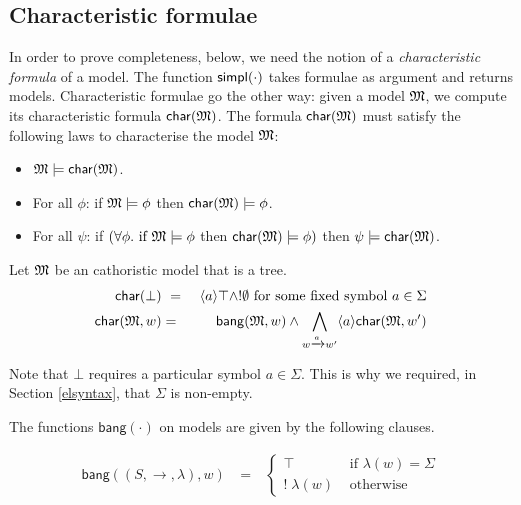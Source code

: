 \subsection{Characteristic formulae}

In order to prove completeness, below, we need the notion of a
\emph{characteristic formula} of a model.  The function
$\mathsf{simpl}(\cdot)$ takes formulae as argument and returns
models. Characteristic formulae go the other way: given a model
$\frak{M}$, we compute its characteristic formula $\mathsf{char}(\frak{M})$. The
formula $\mathsf{char}(\frak{M})$ must satisfy the following laws to characterise
the model $\frak{M}$:
\begin{itemize}

\item $\frak{M} \models \mathsf{char}(\frak{M})$.

\item For all $\phi$: if $\frak{M} \models \phi$ then $\mathsf{char}(\frak{M}) \models
  \phi$.

\item For all $\psi$: if $(\forall \phi . \text{ if } \frak{M}
  \models \phi$ then $\mathsf{char}(\frak{M}) \models \phi)$ then 
  $\psi \models \mathsf{char}(\frak{M})$.

\end{itemize}

\clearpage

\clearpage

\begin{definition}
Let $\frak{M}$ be an cathoristic model that is a tree.
\begin{eqnarray*}
  \mathsf{char}(\bot) &\ =\ & \langle a \rangle \top \land ! \emptyset  \mbox{ for some fixed symbol }a \in \Sigma  \\
  \mathsf{char}(\frak{M}, w) & = & \mathsf{bang}(\frak{M},w) \land \bigwedge_{w \xrightarrow{a} w'} \langle a \rangle \mathsf{char}(\frak{M}, w')  
\end{eqnarray*}

\end{definition}

\NI Note that $\bot$ requires a particular symbol $a \in \Sigma$. This
is why we required, in Section \ref{elsyntax}, that $\Sigma$ is
non-empty.

The functions $\mathsf{bang}(\cdot)$ on models are given by the
following clauses.

\begin{eqnarray*}
  \mathsf{bang}((S,\rightarrow,\lambda),w) 
     & \ = \ & 
  \begin{cases}
    \top & \mbox{ if } \lambda(w) = \Sigma  \\
    ! \; \lambda(w) & \mbox{ otherwise }  
  \end{cases} \\
\end{eqnarray*}


